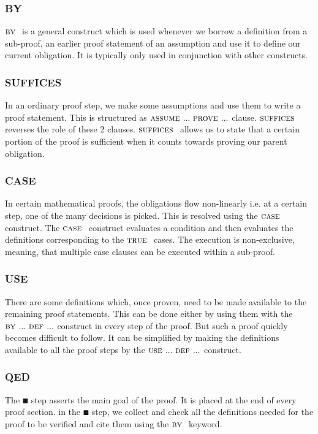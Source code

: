 \documentclass[fleqn]{tukseminar}
\begin{document}
			\subsubsection{BY}
			$\textsc{by }$ is a general construct which is used whenever we borrow a definition from a sub-proof, an earlier proof statement of an assumption and use it to define our current obligation. It is typically only used in conjunction with other constructs.
			\subsubsection{SUFFICES}
			\label{suffices}
			In an ordinary proof step, we make some assumptions and use them to write a proof statement. This is structured as $\textsc{assume } ...\ \textsc{prove } ...$ clause. $\textsc{suffices }$ reverses the role of these 2 clauses. $\textsc{suffices }$ allows us to state that a certain portion of the proof is sufficient when it counts towards proving our parent obligation. 
			
			\subsubsection{CASE}
			\label{case}
			In certain mathematical proofs, the obligations flow non-linearly i.e. at a certain step, one of the many decisions is picked. This is resolved using the $\textsc{case }$ construct. The $\textsc{case }$ construct evaluates a condition and then evaluates the definitions corresponding to the $\mbox{\textsc{true }}$ cases. The execution is non-exclusive, meaning, that multiple case clauses can be executed within a sub-proof.
			
			\subsubsection{USE}
			
			There are some definitions which, once proven, need to be made available to the remaining proof statements. This can be done either by using them with the $\textsc{by } ...\  \textsc{def } ... $ construct in every step of the proof. But such a proof quickly becomes difficult to follow. It can be simplified by making the definitions available to all the proof steps by the $\textsc{use } ...\  \textsc{def } ... $ construct. 
			
			\subsubsection{QED}
			The $\QED$ step asserts the main goal of the proof. It is placed at the end of every proof section. in the $\QED$ step, we collect and check all the definitions needed for the proof to be verified and cite them using the $\textsc{by }$ keyword. 
			
\end{document}
